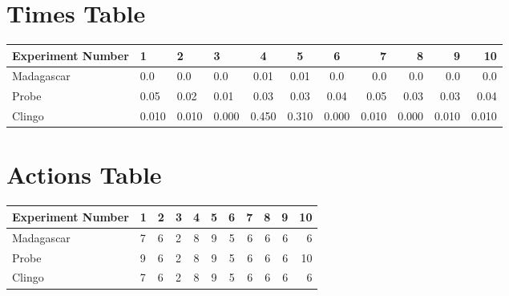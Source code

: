 \documentclass[8pt]{article}
\begin{document}
\begin{landscape}
\section{Times Table}\begin{tabular}{ | l | l | l | l | c | c | c | r | r | r | r | }\hline
Experiment Number & 1 & 2 & 3 & 4 & 5 & 6 & 7 & 8 & 9 & 10\\  \hline
Madagascar & 0.0 & 0.0 & 0.0 & 0.01 & 0.01 & 0.0 & 0.0 & 0.0 & 0.0 & 0.0\\  \hline
Probe & 0.05 & 0.02 & 0.01 & 0.03 & 0.03 & 0.04 & 0.05 & 0.03 & 0.03 & 0.04\\  \hline
Clingo & 0.010 & 0.010 & 0.000 & 0.450 & 0.310 & 0.000 & 0.010 & 0.000 & 0.010 & 0.010\\  \hline
\end{tabular}
\section{Actions Table}\begin{tabular}{ | l | l | l | l | c | c | c | r | r | r | r | }\hline
Experiment Number & 1 & 2 & 3 & 4 & 5 & 6 & 7 & 8 & 9 & 10\\ \hline
 Madagascar & 7 & 6 & 2 & 8 & 9 & 5 & 6 & 6 & 6 & 6\\ \hline
 Probe & 9 & 6 & 2 & 8 & 9 & 5 & 6 & 6 & 6 & 10\\ \hline
 Clingo & 7 & 6 & 2 & 8 & 9 & 5 & 6 & 6 & 6 & 6\\ \hline
\end{tabular}
\end{landscape}
\end{document}
